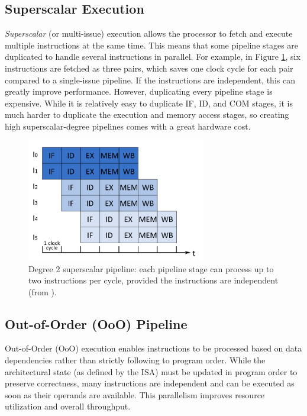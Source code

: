 \subsection{Superscalar Execution}

\textit{Superscalar} (or multi-issue) execution allows the processor to fetch and execute multiple instructions at the same time. This means that some pipeline stages are duplicated to handle several instructions in parallel. For example, in Figure \ref{fig:superscalar}, six instructions are fetched as three pairs, which saves one clock cycle for each pair compared to a single-issue pipeline. If the instructions are independent, this can greatly improve performance. However, duplicating every pipeline stage is expensive. While it is relatively easy to duplicate IF, ID, and COM stages, it is much harder to duplicate the execution and memory access stages, so creating high superscalar-degree pipelines comes with a great hardware cost.

\begin{figure}[H]
    \centering
    \includegraphics[width=0.7\textwidth]{figures/multiscalar-execution.png}
    \caption{Degree 2 superscalar pipeline: each pipeline stage can process up to two instructions per cycle, provided the instructions are independent (from \cite{perais_increasing_2016}).}
    \label{fig:superscalar}
\end{figure}

\subsection{Out-of-Order (OoO) Pipeline}
Out-of-Order (OoO) execution enables instructions to be processed based on data dependencies rather than strictly following to program order. While the architectural state (as defined by the ISA) must be updated in program order to preserve correctness, many instructions are independent and can be executed as soon as their operands are available. This parallelism improves resource utilization and overall throughput.

